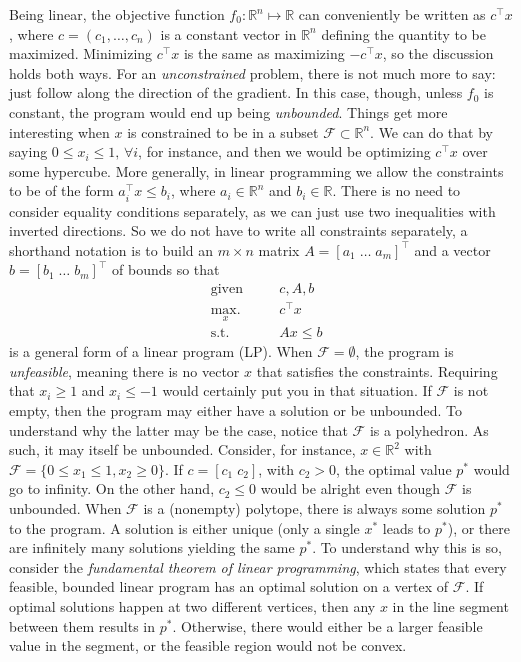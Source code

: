			Being linear, the objective function $f_0 : \mathbb{R}^n \mapsto \mathbb{R}$ can conveniently be written as $c^\intercal x$, where $c = (c_1, \ldots, c_n)$ is a constant vector in $\mathbb{R}^n$ defining the quantity to be maximized. Minimizing $c^\intercal x$ is the same as maximizing $-c^\intercal x$, so the discussion holds both ways. For an \emph{unconstrained} problem, there is not much more to say: just follow along the direction of the gradient. In this case, though, unless $f_0$ is constant, the program would end up being \emph{unbounded}. Things get more interesting when $x$ is constrained to be in a subset $\mathcal{F} \subset \mathbb{R}^n$. We can do that by saying $0 \leq x_i \leq 1, \,\forall i$, for instance, and then we would be optimizing $c^\intercal x$ over some hypercube. More generally, in linear programming we allow the constraints to be of the form $a_i^\intercal x \leq b_i$, where $a_i \in \mathbb{R}^n$ and $b_i \in \mathbb{R}$. There is no need to consider equality conditions separately, as we can just use two inequalities with inverted directions. So we do not have to write all constraints separately, a shorthand notation is to build an $m \times n$ matrix $A = [a_1 \; \ldots \; a_m]^\intercal$ and a vector $b = [b_1 \; \ldots \; b_m]^\intercal$ of bounds so that
			\begin{subequations}
				\begin{alignat}{2}
					&\text{given}    &\quad & c, A, b \\
					&\underset{x}{\text{max.}}   &	  & c^\intercal x \\
					&\text{s.t.}    &      & Ax \leq b 
				\end{alignat}
				\label{eq:lp}
			\end{subequations}
			is a general form of a linear program (LP). When $\mathcal{F} = \emptyset$, the program is \emph{unfeasible}, meaning there is no vector $x$ that satisfies the constraints. Requiring that $x_i \geq 1$ and $x_i \leq -1$ would certainly put you in that situation. If $\mathcal{F}$ is not empty, then the program may either have a solution or be unbounded. To understand why the latter may be the case, notice that $\mathcal{F}$ is a polyhedron. As such, it may itself be unbounded. Consider, for instance, $x \in \mathbb{R}^2$ with $\mathcal{F} = \{ 0 \leq x_1 \leq 1, x_2 \geq 0 \}$. If $c = [c_1 \; c_2]$, with $c_2 > 0$, the optimal value $p^*$ would go to infinity. On the other hand, $c_2 \leq 0$ would be alright even though $\mathcal{F}$ is unbounded. When $\mathcal{F}$ is a (nonempty) polytope, there is always some solution $p^*$ to the program. A solution is either unique (only a single $x^*$ leads to $p^*$), or there are infinitely many solutions yielding the same $p^*$. To understand why this is so, consider the \emph{fundamental theorem of linear programming}, which states that every feasible, bounded linear program has an optimal solution on a vertex of $\mathcal{F}$. If optimal solutions happen at two different vertices, then any $x$ in the line segment between them results in $p^*$. Otherwise, there would either be a larger feasible value in the segment, or the feasible region would not be convex. 

